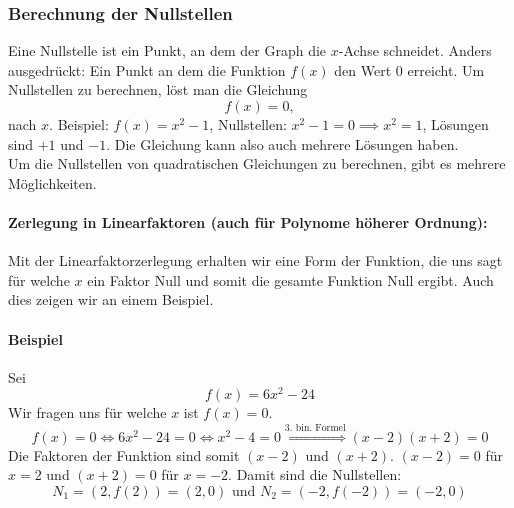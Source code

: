 \subsubsection{Berechnung der Nullstellen} \label{sec:quadnullstellen}
Eine Nullstelle ist ein Punkt, an dem der Graph die $x$-Achse schneidet. Anders ausgedrückt: Ein Punkt an dem die Funktion $f(x)$ den Wert $0$ erreicht. Um Nullstellen zu berechnen, löst man die Gleichung
\begin{equation*}
f(x) = 0,
\end{equation*}
nach $x$. Beispiel: $f(x)=x^2-1$, Nullstellen: $x^2-1=0\implies x^2=1$, Lösungen sind $+1$ und $-1$. Die Gleichung kann also auch mehrere Lösungen haben.\\
Um die Nullstellen von quadratischen Gleichungen zu berechnen, gibt es mehrere Möglichkeiten.

\paragraph{Zerlegung in Linearfaktoren (auch für Polynome höherer Ordnung):}

Mit der Linearfaktorzerlegung erhalten wir eine Form der Funktion, die uns sagt für welche $x$ ein Faktor Null und somit die gesamte Funktion Null ergibt. Auch dies zeigen wir an einem Beispiel.

\paragraph{Beispiel}
Sei
\begin{equation*}
f(x) = 6x^2 - 24
\end{equation*}
Wir fragen uns für welche $x$ ist $f(x) = 0$.
\begin{equation*}
f(x) = 0 \iff 6x^2 - 24 = 0 \iff x^2 - 4 = 0 \stackrel{\text{3. bin. Formel}}{\iff} (x-2)(x+2) = 0 
\end{equation*}
Die Faktoren der Funktion sind somit $(x-2)$ und $(x+2)$. $(x-2) = 0$ für $x = 2$ und $(x+2) = 0$ für  $x = -2$. Damit sind die Nullstellen:
\begin{equation*}
N_1 = (2, f(2)) = (2, 0) \text{ und } N_2 = (-2, f(-2)) = (-2, 0)
\end{equation*}


